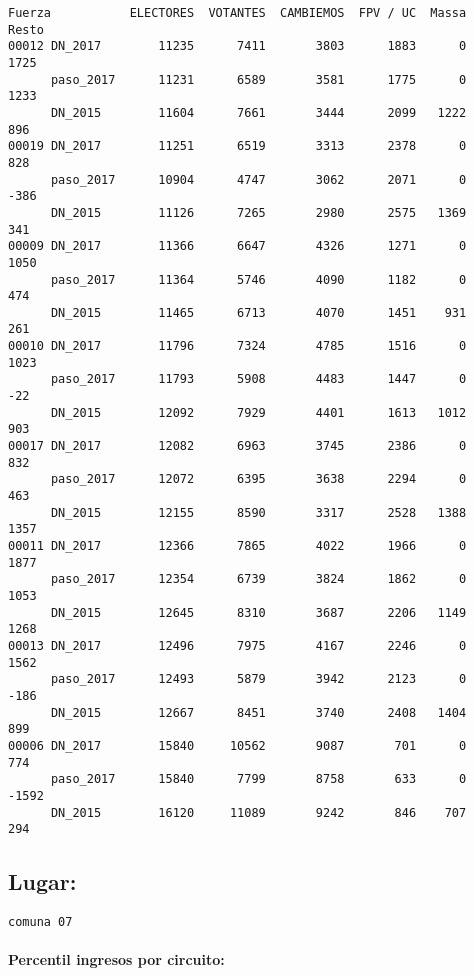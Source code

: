 \documentclass[11pt]{article}
\begin{document}
    \begin{verbatim}
Fuerza           ELECTORES  VOTANTES  CAMBIEMOS  FPV / UC  Massa  Resto
00012 DN_2017        11235      7411       3803      1883      0   1725
      paso_2017      11231      6589       3581      1775      0   1233
      DN_2015        11604      7661       3444      2099   1222    896
00019 DN_2017        11251      6519       3313      2378      0    828
      paso_2017      10904      4747       3062      2071      0   -386
      DN_2015        11126      7265       2980      2575   1369    341
00009 DN_2017        11366      6647       4326      1271      0   1050
      paso_2017      11364      5746       4090      1182      0    474
      DN_2015        11465      6713       4070      1451    931    261
00010 DN_2017        11796      7324       4785      1516      0   1023
      paso_2017      11793      5908       4483      1447      0    -22
      DN_2015        12092      7929       4401      1613   1012    903
00017 DN_2017        12082      6963       3745      2386      0    832
      paso_2017      12072      6395       3638      2294      0    463
      DN_2015        12155      8590       3317      2528   1388   1357
00011 DN_2017        12366      7865       4022      1966      0   1877
      paso_2017      12354      6739       3824      1862      0   1053
      DN_2015        12645      8310       3687      2206   1149   1268
00013 DN_2017        12496      7975       4167      2246      0   1562
      paso_2017      12493      5879       3942      2123      0   -186
      DN_2015        12667      8451       3740      2408   1404    899
00006 DN_2017        15840     10562       9087       701      0    774
      paso_2017      15840      7799       8758       633      0  -1592
      DN_2015        16120     11089       9242       846    707    294
    \end{verbatim}

    
    \hypertarget{lugar}{%
\subsection{Lugar:}\label{lugar}}

    
    \begin{Verbatim}[commandchars=\\\{\}]
comuna 07

    \end{Verbatim}

    \hypertarget{percentil-ingresos-por-circuito}{%
\paragraph{Percentil ingresos por
circuito:}\label{percentil-ingresos-por-circuito}}
\end{document}
